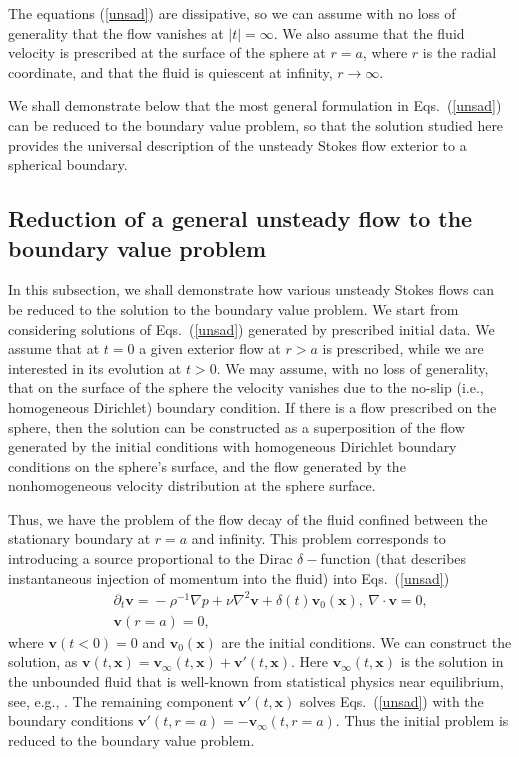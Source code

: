 \documentclass[aps,prx,twocolumn,amsmath,amssymb,amsfonts]{revtex4-2}
\begin{document}
The equations (\ref{unsad}) are dissipative, so we can assume with no loss of generality that the flow vanishes at $|t|=\infty$. We also assume that the fluid velocity is prescribed at the surface of the sphere at $r\!=\!a$, where $r$ is the radial coordinate, and that the fluid is quiescent at infinity, $r \!\rightarrow \!\infty$.

We shall demonstrate below that the most general formulation in Eqs.~(\ref{unsad}) can be reduced to the boundary value problem, so that the solution studied here provides the universal description of the unsteady Stokes flow exterior to a spherical boundary.


\subsection{Reduction of a general unsteady flow to the boundary value problem} \label{flok}

In this subsection, we shall demonstrate how various unsteady Stokes flows can be reduced to the solution to the boundary value problem. We start from considering solutions of Eqs.~(\ref{unsad}) generated by prescribed initial data. We assume that at $t\!=\!0$ a given exterior flow at $r>a$ is prescribed, while we are interested in its evolution at $t\!>\!0$. We may assume, with no loss of generality, that on the surface of the sphere the velocity vanishes due to the no-slip (i.e., homogeneous Dirichlet) boundary condition. If there is a flow prescribed on the sphere, then the solution can be constructed as a superposition of the flow generated by the initial conditions with homogeneous Dirichlet boundary conditions on the sphere's surface, and the flow generated by the nonhomogeneous velocity distribution at the sphere surface.

Thus, we have the problem of the flow decay of the fluid confined between the stationary boundary at $r\!=\!a$ and infinity. This problem corresponds to introducing a source proportional to the Dirac $\delta-$function (that describes instantaneous injection of momentum into the fluid) into Eqs.~(\ref{unsad})
\begin{eqnarray}
&& \partial_t \bm v\!=\!-\rho^{-1}\nabla p\!+\!\nu \nabla^2\bm v+\delta(t)\bm v_0(\bm x),\ \nabla\cdot\bm v=0, \nonumber \\
&&\bm v(r=a)\!=\!0,
\end{eqnarray}
where $\bm v(t<0)=0$ and $\bm v_0(\bm x)$ are the initial conditions. We can construct the solution, as $\bm v(t, \bm x)=\bm v_{\infty}(t, \bm x)+\bm v'(t, \bm x)$. Here $\bm v_{\infty}(t, \bm x)$ is the solution in the unbounded fluid that is well-known from statistical physics near equilibrium, see, e.g., \cite{reichl}. The remaining component $\bm v'(t, \bm x)$ solves Eqs.~(\ref{unsad}) with the boundary conditions $\bm v'(t, r=a)=-\bm v_{\infty}(t, r=a)$. Thus the initial problem is reduced to the boundary value problem.
\end{document}
